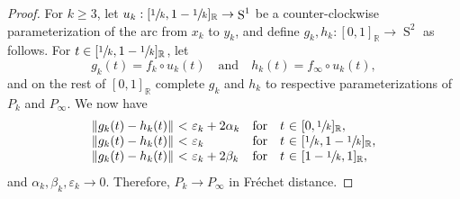 \documentclass[JEP,XML,SOM,Unicode,NoFloatCountersInSection,published]{cedram}
\let\nicefrac\sfrac
\theoremstyle{remark}
\let\mb\mathbb
\let\eps\varepsilon
\DeclareMathOperator{\sphere}{S}
\begin{document}
\begin{proof}
For $k\geq 3$,
let $u_k : [\nicefrac{1}{k},1-\nicefrac{1}{k}]_\mb{R} \to \sphere^1$ be a counter-clockwise parameterization of the arc from $x_k$ to $y_k$, and define $g_k,h_k : [0,1]_\mb{R} \to \sphere^2$ as follows.
For $t \in [\nicefrac{1}{k},1-\nicefrac{1}{k}]_\mb{R}$, let
\[ g_k(t) = f_k \circ u_k(t) \quad \text{and} \quad h_k(t) = f_\infty \circ u_k(t),\]
and on the rest of $[0,1]_\mb{R}$ complete $g_k$ and $h_k$ to respective parameterizations of $P_k$ and $P_\infty$.
We now have
\[\begin{array}{r@{\ <\ }l@{\quad \text{for}\quad }r@{\ \in\ }l}
\|g_k(t)-h_k(t)\| & \eps_k +2\alpha_k & t & [0,\nicefrac{1}{k}]_\mb{R}, \\
\|g_k(t)-h_k(t)\| & \eps_k & t & [\nicefrac{1}{k},1-\nicefrac{1}{k}]_\mb{R}, \\
\|g_k(t)-h_k(t)\| & \eps_k +2\beta_k & t & [1-\nicefrac{1}{k},1]_\mb{R},
\end{array}\]
and $\alpha_k,\beta_k,\eps_k \to 0$. Therefore, $P_k \to P_\infty$ in Fréchet distance.
\end{proof}
\end{document}
